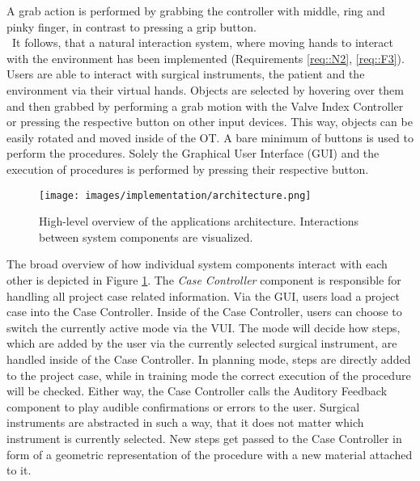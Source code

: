 A grab action is performed by grabbing the controller with middle, ring and pinky finger, in contrast to pressing a grip button.
\\ It follows, that a natural interaction system, where moving hands to interact with the environment has been implemented (Requirements \ref{req::N2}, \ref{req::F3}).
Users are able to interact with surgical instruments, the patient and the environment via their virtual hands.
Objects are selected by hovering over them and then grabbed by performing a grab motion with the Valve Index Controller or pressing the respective button on other input devices.
This way, objects can be easily rotated and moved inside of the OT.
A bare minimum of buttons is used to perform the procedures.
Solely the Graphical User Interface (GUI) and the execution of procedures is performed by pressing their respective button.

\begin{figure}[ht]
    \centering
    \texttt{[image: images/implementation/architecture.png]}
    \caption{\label{fig::ImplementationArchitecture}High-level overview of the applications architecture. Interactions between system components are visualized.}
\end{figure}

The broad overview of how individual system components interact with each other is depicted in Figure \ref{fig::ImplementationArchitecture}.
The \emph{Case Controller} component is responsible for handling all project case related information.
Via the GUI, users load a project case into the Case Controller.
Inside of the Case Controller, users can choose to switch the currently active mode via the VUI.
The mode will decide how steps, which are added by the user via the currently selected surgical instrument, are handled inside of the Case Controller.
In planning mode, steps are directly added to the project case, while in training mode the correct execution of the procedure will be checked.
Either way, the Case Controller calls the Auditory Feedback component to play audible confirmations or errors to the user.
Surgical instruments are abstracted in such a way, that it does not matter which instrument is currently selected.
New steps get passed to the Case Controller in form of a geometric representation of the procedure with a new material attached to it.
